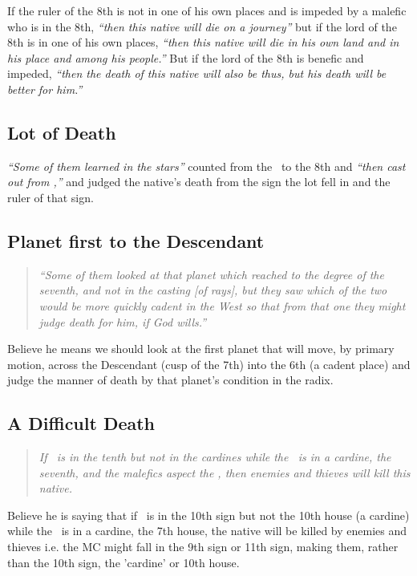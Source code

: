 If  the ruler of the 8th is not in one of his own places and is impeded by a malefic who is in the 8th, \textsl{``then this native will die on a journey''} but if the lord of the 8th is in one of his own places, \textsl{``then this native will die in his own land and in his place and among his people.''} But if the lord of the 8th is benefic and impeded, \textsl{``then the death of this native will also be thus, but his death will be better for him.''}

\subsection{Lot of Death}
\textsl{``Some of them learned in the stars''}  counted from the \Moon\, to the 8th and \textsl{``then cast out from \Saturn,''} and judged the native's death from the sign the lot fell in and the ruler of that sign.

\subsection{Planet first to the Descendant}
\begin{quote}
\textsl{``Some of them looked at that planet which reached to the degree of the seventh, and not in the casting [of rays], but they saw which of the two would be more quickly cadent in the West so that from that one they might judge death for him, if God wills.''}
\end{quote}
Believe he means we should look at the first planet that will move, by primary motion, across the Descendant (cusp of the 7th) into the 6th (a cadent place) and judge the manner of death by that planet's condition in the radix.

\subsection{A Difficult Death}
\begin{quote}
\textsl{If \Mars\, is in the tenth but not in the cardines while the \Moon\, is in a cardine, the seventh, and the malefics aspect the \Moon, then enemies and thieves will kill this native.}
\end{quote}

Believe he is saying that if \Mars\ is in the 10th sign but not the 10th house (a cardine) while the \Moon\ is in a cardine, the 7th house, the native will be killed by enemies and thieves i.e. the MC might fall in the 9th sign or 11th sign, making them, rather than the 10th sign, the 'cardine' or 10th house.

